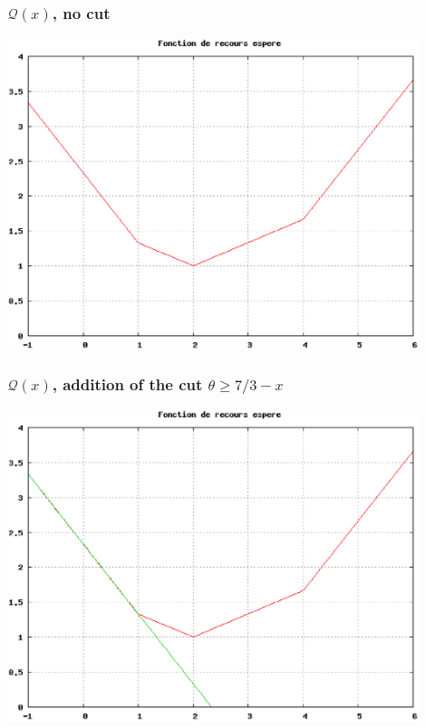 \documentclass{beamer}
\begin{document}
\begin{frame}
	\frametitle{$\mathcal{Q}(x)$, no cut}
	
	\includegraphics[width=0.9\textwidth]{all.eps}
	
\end{frame}

\begin{frame}
	\frametitle{$\mathcal{Q}(x)$, addition of the cut $\theta \geq 7/3-x$}
	
	\includegraphics[width=0.9\textwidth]{coupe_1.eps}
	
\end{frame}
\end{document}
